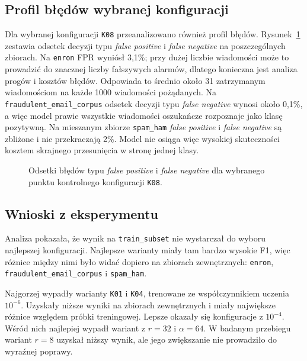 \subsection{Profil błędów wybranej konfiguracji}

Dla wybranej konfiguracji \texttt{K08} przeanalizowano również profil błędów.
Rysunek~\ref{fig:checkpoint-best-error-rates} zestawia odsetek decyzji typu
\emph{false positive} i \emph{false negative} na poszczególnych zbiorach. Na
\texttt{enron} FPR wyniósł 3,1\%; przy dużej liczbie wiadomości może to prowadzić
do znacznej liczby fałszywych alarmów, dlatego konieczna jest analiza progów i
kosztów błędów. Odpowiada to średnio około 31 zatrzymanym wiadomościom na każde
1000 wiadomości pożądanych. Na
\texttt{fraudulent\_email\_corpus} odsetek decyzji typu \emph{false negative}
wynosi około 0,1\%, a więc model prawie wszystkie wiadomości oszukańcze
rozpoznaje jako klasę pozytywną. Na mieszanym zbiorze \texttt{spam\_ham}
\emph{false positive} i \emph{false negative} są zbliżone i nie przekraczają
2\%. Model nie osiąga więc wysokiej skuteczności kosztem skrajnego przesunięcia
w stronę jednej klasy.

\begin{figure}[htbp]
\centering

\caption{Odsetki błędów typu \emph{false positive} i \emph{false negative} dla
wybranego punktu kontrolnego konfiguracji \texttt{K08}.}
\label{fig:checkpoint-best-error-rates}
\end{figure}

\subsection{Wnioski z eksperymentu}

Analiza pokazała, że wynik na \texttt{train\_subset} nie wystarczał do wyboru
najlepszej konfiguracji. Najlepsze warianty miały tam bardzo wysokie F1, więc
różnice między nimi było widać dopiero na zbiorach zewnętrznych:
\texttt{enron}, \texttt{fraudulent\_email\_corpus} i \texttt{spam\_ham}.

Najgorzej wypadły warianty \texttt{K01} i \texttt{K04}, trenowane ze
współczynnikiem uczenia \(10^{-6}\). Uzyskały niższe wyniki na zbiorach
zewnętrznych i miały największe różnice względem próbki treningowej. Lepsze okazały się
konfiguracje z \(10^{-4}\). Wśród nich najlepiej wypadł wariant z \(r=32\) i
\(\alpha=64\). W badanym przebiegu wariant \(r=8\) uzyskał niższy wynik, ale jego zwiększanie
nie prowadziło do wyraźnej poprawy.

